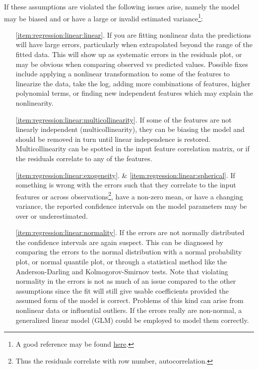 If these assumptions are violated the following issues arise,
namely the model may be biased and or have a large or invalid estimated variance\footnote{A good reference may be found \href{http://people.duke.edu/~rnau/testing.htm}{here}.}:

\begin{itemize}[noitemsep]
\item[\ref{item:regression:linear:linear}.] If you are fitting nonlinear data the predictions will have large errors,
particularly when extrapolated beyond the range of the fitted data.
This will show up as systematic errors in the residuals plot,
or may be obvious when comparing observed vs predicted values.
Possible fixes include applying a nonlinear transformation to some of the features to linearize the data, \eg take the log,
adding more combinations of features, \eg higher polynomial terms,
or finding new independent features which may explain the nonlinearity.

\item[\ref{item:regression:linear:multicollinearity}.] If some of the features are not linearly independent (multicollinearity),
they can be biasing the model and should be removed in turn until linear independence is restored.
Multicollinearity can be spotted in the input feature correlation matrix,
or if the residuals correlate to any of the features.

\item[\ref{item:regression:linear:exogeneity}. \& \ref{item:regression:linear:spherical}.] If something is wrong with the errors
such that they correlate to the input features or across observations\footnote{Thus the residuals correlate with row number, \ie autocorrelation.},
have a non-zero mean, or have a changing variance,
the reported confidence intervals on the model parameters may be over or underestimated.

\item[\ref{item:regression:linear:normality}.] If the errors are not normally distributed the confidence intervals are again suspect.
This can be diagnosed by comparing the errors to the normal distribution with a normal probability plot, or normal quantile plot,
or through a statistical method like the Anderson-Darling and Kolmogorov-Smirnov tests.
Note that violating normality in the errors is not as much of an issue compared to the other assumptions
since the fit will still give usable coefficients provided the assumed form of the model is correct.
Problems of this kind can arise from nonlinear data or influential outliers.
If the errors really are non-normal, a generalized linear model (GLM) could be employed to model them correctly.
\end{itemize}

